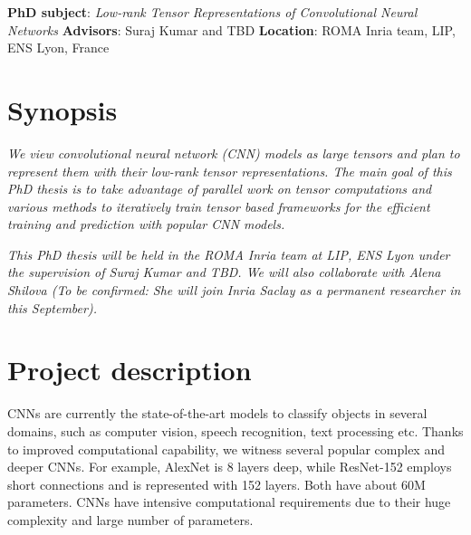\documentclass[11pt]{article}
\date{}
\begin{document}

 \noindent\textbf{PhD subject}: \emph{Low-rank Tensor Representations of Convolutional Neural Networks }\newline
 \textbf{Advisors}: Suraj Kumar and TBD \newline
 \textbf{Location}: ROMA Inria team, LIP, ENS Lyon, France

\section*{Synopsis}

\emph{We view convolutional neural network (CNN) models as large tensors and plan to represent them with their low-rank tensor representations. The main goal of this PhD thesis is to take advantage of parallel work on tensor computations and various methods to iteratively train tensor based frameworks for the efficient training and prediction with popular CNN models.}


\emph{This PhD thesis will be held in the ROMA Inria team at LIP, ENS Lyon under the supervision of Suraj Kumar and TBD. We will also collaborate with  Alena Shilova (To be confirmed: She will  join Inria Saclay as a permanent researcher in this September). }



\section{Project description}

CNNs are currently the state-of-the-art models to classify objects in several domains, such as computer vision, speech recognition, text processing etc. Thanks to improved computational capability, we witness several popular complex and deeper CNNs. For example, AlexNet is 8 layers deep, while ResNet-152 employs short connections and is represented with 152 layers. Both have about 60M parameters. CNNs have intensive computational requirements due to their huge complexity and large number of parameters. 
\end{document}
